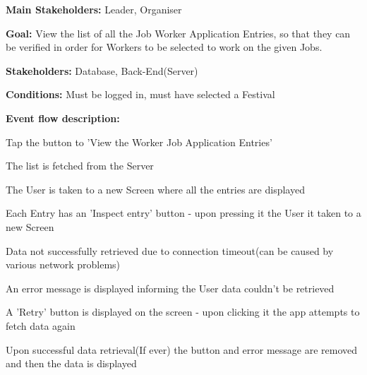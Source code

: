 			\noindent {}
			\begin{packed_item}
				\item \textbf{Main Stakeholders:} Leader, Organiser
				\item \textbf{Goal:} View the list of all the Job Worker Application Entries, so that they can be verified in order for Workers to be selected to work on the given Jobs.
				\item \textbf{Stakeholders: } Database, Back-End(Server)
				\item \textbf{Conditions: } Must be logged in, must have selected a Festival
				\item \textbf{Event flow description: }
				\begin{packed_enum}
					\item Tap the button to 'View the Worker Job Application Entries'
					\item The list is fetched from the Server
					\item The User is taken to a new Screen where all the entries are displayed
					\item Each Entry has an 'Inspect entry' button - upon pressing it the User it taken to a new Screen
				\end{packed_enum}
				
				\begin{packed_item}
					\item[2.a] Data not successfully retrieved due to connection timeout(can be caused by various network problems)
					\item[] \begin{packed_enum}
						\item An error message is displayed informing the User data couldn't be retrieved
						\item A 'Retry' button is displayed on the screen - upon clicking it the app attempts to fetch data again
						\item Upon successful data retrieval(If ever) the button and error message are removed and then the data is displayed
					\end{packed_enum}
				\end{packed_item}
			\end{packed_item}
			
